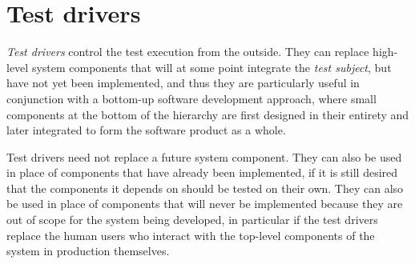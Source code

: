 \section{Test drivers}
\textit{Test drivers} control the test execution from the outside.
\autocite{TestingTheoryDriver}
They can replace high-level system components that will
at some point integrate the \textit{test subject},
but have not yet been implemented,
and thus they are particularly useful in conjunction with
a bottom-up software development approach,
where small components at the bottom of the hierarchy
are first designed in their entirety
and later integrated to form the software product as a whole.

Test drivers need not replace a future system component.
They can also be used in place of components that
have already been implemented,
if it is still desired that the components it depends on
should be tested on their own.
They can also be used in place of components that
will never be implemented
because they are out of scope for the system being developed,
in particular if the test drivers replace the human users who interact
with the top-level components of the system in production themselves.
\autocite{ArtOfSoftwareTesting}
